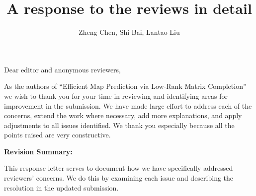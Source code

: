 \documentclass{article}
\title{A response to the reviews in detail}
\author{Zheng Chen, Shi Bai, Lantao Liu}
\date{}
\begin{document}
\maketitle

\noindent Dear editor and anonymous reviewers,
\medskip

As the authors of ``Efficient Map Prediction via Low-Rank Matrix Completion'' 
we wish to thank you for your time  in reviewing and identifying areas for improvement in the submission. We have made large effort to address each of the concerns, extend the work where necessary, add more explanations, and apply adjustments to all issues identified. We thank you especially because all the points raised are very constructive. 

{
\textbf{Revision Summary:} 
}

This response letter serves to document how we have specifically addressed reviewers' concerns. We do this by examining each issue and describing the resolution in the updated
submission.
\end{document}
